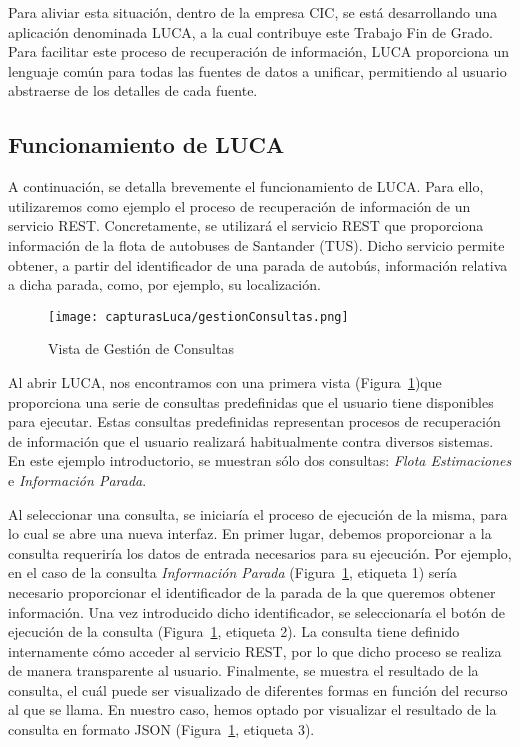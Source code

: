 Para aliviar esta situación, dentro de la empresa CIC, se está desarrollando una aplicación denominada LUCA, a la cual contribuye este Trabajo Fin de Grado. Para facilitar este proceso de recuperación de información, LUCA proporciona un lenguaje común para todas las fuentes de datos a unificar, permitiendo al usuario abstraerse de los detalles de cada fuente.

\subsection{Funcionamiento de LUCA}

A continuación, se detalla brevemente el funcionamiento de LUCA. Para ello, utilizaremos como ejemplo el proceso de recuperación de información de un servicio REST. Concretamente, se utilizará el servicio REST que proporciona información de la flota de autobuses de Santander (TUS). Dicho servicio permite obtener, a partir del identificador de una parada de autobús, información relativa a dicha parada, como, por ejemplo, su localización.

\begin{figure}[!tb]
    \centering
 	\texttt{[image: capturasLuca/gestionConsultas.png]}
	\caption{Vista de Gestión de Consultas}
    \label{fig:gestionConsulta}
\end{figure}

Al abrir LUCA, nos encontramos con una primera vista (Figura~\ref{fig:gestionConsulta})que proporciona una serie de consultas predefinidas que el usuario tiene disponibles para ejecutar. Estas consultas predefinidas representan procesos de recuperación de información que el usuario realizará habitualmente contra diversos sistemas. En este ejemplo introductorio, se muestran sólo dos consultas: \emph{Flota Estimaciones} e \emph{Información Parada}.


Al seleccionar una consulta, se iniciaría el proceso de ejecución de la misma, para lo cual se abre una nueva interfaz. En primer lugar, debemos proporcionar a la consulta requeriría los datos de entrada necesarios para su ejecución. Por ejemplo, en el caso de la consulta \emph{Información Parada} (Figura~\ref{fig:gestionConsulta}, etiqueta 1) sería necesario proporcionar el identificador de la parada de la que queremos obtener información. Una vez introducido dicho identificador, se seleccionaría el botón de ejecución de la consulta (Figura~\ref{fig:gestionConsulta}, etiqueta 2). La consulta tiene definido internamente cómo acceder al servicio REST, por lo que dicho proceso se realiza de manera transparente al usuario. Finalmente, se muestra el resultado de la consulta, el cuál puede ser visualizado de diferentes formas en función del recurso al que se llama. En nuestro caso, hemos optado por visualizar el resultado de la consulta en formato JSON (Figura~\ref{fig:gestionConsulta}, etiqueta 3).

